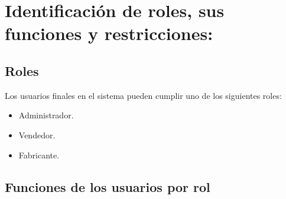 \section{Identificación de roles, sus funciones y restricciones:}
    \subsection{Roles}
    Los usuarios finales en el sistema pueden cumplir uno de los siguientes roles:
    \begin{itemize}
        \item Administrador.
        \item Vendedor.
        \item Fabricante.
    \end{itemize}
    
    \subsection{Funciones de los usuarios por rol}
